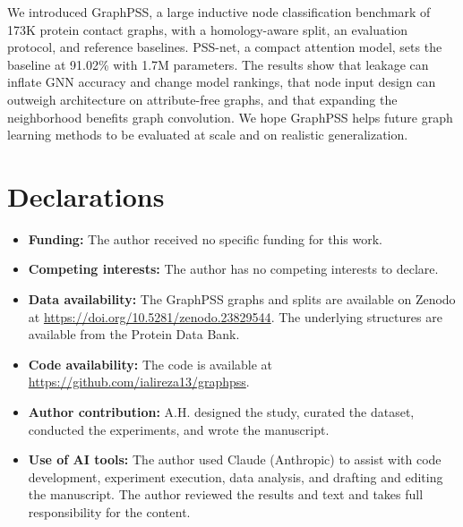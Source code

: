 \documentclass[pdflatex,sn-mathphys-num]{sn-jnl}
\begin{document}
We introduced GraphPSS, a large inductive node classification benchmark of 173K protein contact graphs, with a homology-aware split, an evaluation protocol, and reference baselines. PSS-net, a compact attention model, sets the baseline at 91.02\% with 1.7M parameters. The results show that leakage can inflate GNN accuracy and change model rankings, that node input design can outweigh architecture on attribute-free graphs, and that expanding the neighborhood benefits graph convolution. We hope GraphPSS helps future graph learning methods to be evaluated at scale and on realistic generalization.

\backmatter

\section*{Declarations}

\begin{itemize}
    \item \textbf{Funding:} The author received no specific funding for this work.
    \item \textbf{Competing interests:} The author has no competing interests to declare.
    \item \textbf{Data availability:} The GraphPSS graphs and splits are available on Zenodo at \url{https://doi.org/10.5281/zenodo.23829544}. The underlying structures are available from the Protein Data Bank.
    \item \textbf{Code availability:} The code is available at \url{https://github.com/ialireza13/graphpss}.
    \item \textbf{Author contribution:} A.H. designed the study, curated the dataset, conducted the experiments, and wrote the manuscript.
    \item \textbf{Use of AI tools:} The author used Claude (Anthropic) to assist with code development, experiment execution, data analysis, and drafting and editing the manuscript. The author reviewed the results and text and takes full responsibility for the content.
\end{itemize}


\end{document}
